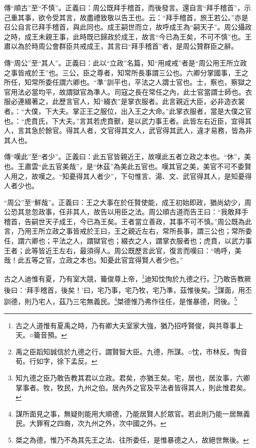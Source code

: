 {\noindent\zhuan{}\fzbyks 傳“順古”至“不慎”。正義曰：周公既拜手稽首，而後發言。還自言“拜手稽首”，示己重其事，欲令受其言，故盡禮致敬以告王也。云：“拜手稽首，旅王若公。”亦是召公自言已拜手稽首，與此同也。成王嗣世而立，故呼成王為“嗣天子”。周公攝政之時，成王未親王事，此時既已歸政於成王，故言“今已為王矣，不可不慎”也。王肅以為於時周公會群臣共戒成王，其言曰“拜手稽首”者，是周公贊群臣之辭。 \par}

{\noindent\zhuan{}\fzbyks 傳“周公”至“其人”。正義曰：此以“立政”名篇，知“用咸戒”者是“周公用王所立政之事皆戒於王”也。三公，臣之尊者，知常所長事謂三公也。六卿分掌國事，王之所任，知常所委任謂六卿也。“準”訓平也，平法之人謂士官也。士，察也，察獄之官用法必當均平，故謂獄官為準人。司寇之長在常任之內，此士官當謂士師也。衣服必連綴著之，此歷言官人，知“綴衣”是掌衣服者。此言親近大臣，必非造衣裳者。：“大僕，下大夫。掌正王之服位，出入王之大命。”此掌衣服者，當是大僕之官也。：“虎賁氏，下大夫。”言其若虎賁獸，是以武力事王者。此皆左右近臣，宜得其人，言其急於餘官。得其人者，文官得其文人，武官得其武人，違才易務，皆為非其人也。 \par}

{\noindent\zhuan{}\fzbyks 傳“嘆此”至“者少”。正義曰：此五官皆親近王，故嘆此五者立政之本也。“休”，美也。王肅雲“此五官美哉”，是“休茲”為美此五官也。嘆其官之美，美官不可不委賢人用之，故嘆之。“知憂得其人者少”，下句惟言、湯、文、武官得其人，是知憂得人者少也。 \par}

{\noindent\shu{}\fzkt “周公”至“鮮哉”。正義曰：王之大事在於任賢使能，成王初始即政，猶尚幼少，周公恐其怠忽政事，任非其人，故告以用臣之法。周公順古道而告王曰：“我敢拜手稽首，告嗣世天子成王，今已為王矣。王者當立善政，其事不可不慎。”周公既為此言，乃用王所立政之事皆戒於王曰，王之親近左右，常所長事，謂三公也；常所委任，謂六卿也；平法之人，謂獄官也；綴衣之人，謂掌衣服者也；虎賁，以武力事王者；此等皆近王左右，最須得人。周公既歷言此官，復言而嘆曰：“嗚呼，美哉！此五等之官，立政之本也。知憂此官宜得賢人者少也。” \par}

古之人迪惟有夏，乃有室大競，籥俊尊上帝，\footnote{古之人道惟有夏禹之時，乃有卿大夫室家大強，猶乃招呼賢俊，與共尊事上天。○籥音預。}迪知忱恂於九德之行。\footnote{禹之臣蹈知誠信於九德之行，謂賢智大臣。九德，所謀。○忱，市林反。恂音荀。行如字，徐下孟反。}乃敢告教厥後曰：‘拜手稽首，後矣！’曰，宅乃事，宅乃牧，宅乃準，茲惟後矣。\footnote{知九德之臣乃敢告教其君以立政。君矣，亦猶王矣。宅，居也，居汝事，六卿掌事者。牧，牧民，九州之伯。居內外之官及平法者皆得其人，則此惟君矣。}謀面，用丕訓德，則乃宅人，茲乃三宅無義民。\footnote{謀所面見之事，無疑則能用大順德，乃能居賢人於眾官。若此則乃能一居無義民。大罪宥之四裔，次九州之外，次中國之外。}桀德惟乃弗作往任，是惟暴德，罔後。\footnote{桀之為德，惟乃不為其先王之法、往所委任，是惟暴德之人，故絕世無後。}



